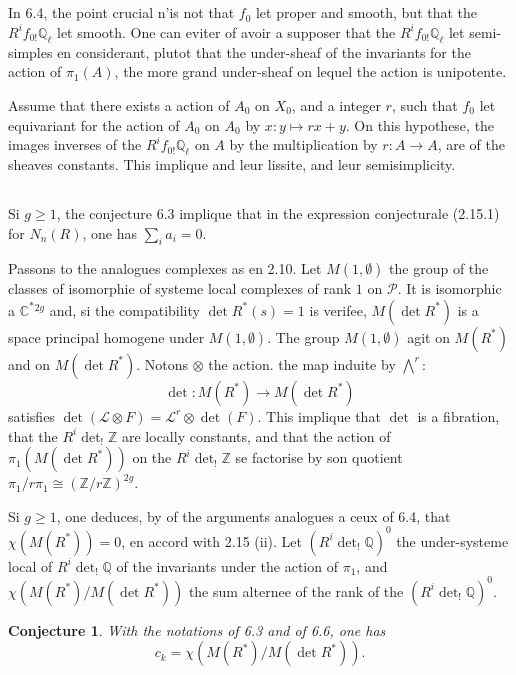 \documentclass[11pt,a4paper]{article}
\theoremstyle{plain}
\newtheorem{conjecture}[theorem]{Conjecture}
\theoremstyle{definition}
\newcommand{\Q}{\mathbb{Q}}
\newcommand{\Z}{\mathbb{Z}}
\newcommand{\C}{\mathbb{C}}
\begin{document}
\subsection{}
In 6.4, the point crucial n'is not that $f_0$ let proper and smooth, but that the $R^i f_{0!} \Q_\ell$ let smooth. One can eviter of avoir a supposer that the $R^i f_{0!} \Q_\ell$ let semi-simples en considerant, plutot that the under-sheaf of the invariants for the action of $\pi_1(A)$, the more grand under-sheaf on lequel the action is unipotente.

Assume that there exists a action of $A_0$ on $X_0$, and a integer $r$, such that $f_0$ let equivariant for the action of $A_0$ on $A_0$ by $x: y \mapsto rx + y$. On this hypothese, the images inverses of the $R^i f_{0!} \Q_\ell$ on $A$ by the multiplication by $r: A \to A$, are of the sheaves constants. This implique and leur lissite, and leur semisimplicity.

\subsection{}
Si $g \geq 1$, the conjecture 6.3 implique that in the expression conjecturale (2.15.1) for $N_n(R)$, one has $\sum_i a_i = 0$.

Passons to the analogues complexes as en 2.10. Let $M(1, \emptyset)$ the group of the classes of isomorphie of systeme local complexes of rank $1$ on $\mathcal{P}$. It is isomorphic a $\C^*{}^{2g}$ and, si the compatibility $\det R^*(s) = 1$ is verifee, $M(\det R^*)$ is a space principal homogene under $M(1, \emptyset)$. The group $M(1, \emptyset)$ agit on $M(R^*)$ and on $M(\det R^*)$. Notons $\otimes$ the action. the map induite by $\bigwedge^r$:
\[
\det: M(R^*) \longrightarrow M(\det R^*)
\]
satisfies $\det(\mathcal{L} \otimes F) = \mathcal{L}^r \otimes \det(F)$. This implique that $\det$ is a fibration, that the $R^i \det_! \Z$ are locally constants, and that the action of $\pi_1(M(\det R^*))$ on the $R^i \det_! \Z$ se factorise by son quotient $\pi_1/r\pi_1 \cong (\Z/r\Z)^{2g}$.

Si $g \geq 1$, one deduces, by of the arguments analogues a ceux of 6.4, that $\chi(M(R^*)) = 0$, en accord with 2.15 (ii). Let $(R^i \det_! \Q)^0$ the under-systeme local of $R^i \det_! \Q$ of the invariants under the action of $\pi_1$, and $\chi(M(R^*)/M(\det R^*))$ the sum alternee of the rank of the $(R^i \det_! \Q)^0$.

\begin{conjecture}
With the notations of 6.3 and of 6.6, one has
\[
c_k = \chi(M(R^*)/M(\det R^*)).
\]
\end{conjecture}
\end{document}
